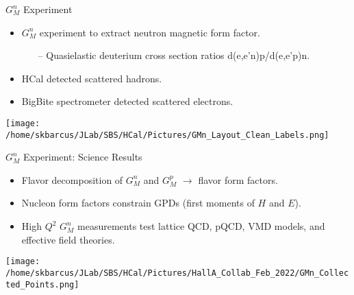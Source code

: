 \documentclass[10pt]{beamer}
\begin{document}
\begin{frame}{$G_M^n$ Experiment}

	\begin{itemize}
		\item \alert{$G_M^n$ experiment to extract neutron magnetic form factor.}
		\begin{itemize}
			\item[--] Quasielastic deuterium cross section ratios d(e,e'n)p/d(e,e'p)n. \tiny{\parencite{gmn_slides,gmn}}
		\end{itemize}		 
		\item HCal detected scattered hadrons.
		\item BigBite spectrometer detected scattered electrons.
	\end{itemize}

	\begin{center}
		\texttt{[image: /home/skbarcus/JLab/SBS/HCal/Pictures/GMn\_Layout\_Clean\_Labels.png]}
	\end{center}

\end{frame}

\begin{frame}{$G_M^n$ Experiment: Science Results}

	\begin{itemize}
		\item Flavor decomposition of $G_M^n$ and $G_M^p$ $\rightarrow$ flavor form factors.
		\item Nucleon form factors constrain GPDs (first moments of $H$ and $E$).
		\item High $Q^2$ $G_M^n$ measurements test lattice QCD, pQCD, VMD models, and effective field theories. \tiny{\parencite{gmn_slides,gmn}}
	\end{itemize}

	\vspace{-4mm}
	\begin{center}
		\texttt{[image: /home/skbarcus/JLab/SBS/HCal/Pictures/HallA\_Collab\_Feb\_2022/GMn\_Collected\_Points.png]}
	\end{center}

\end{frame}
\end{document}
